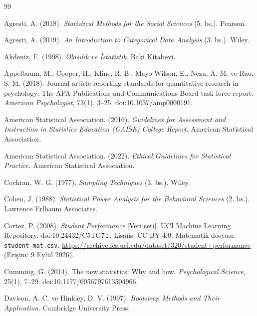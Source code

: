 \cleardoublepage
{}
{}

\begin{thebibliography}{99}

Agresti, A. (2018).
\textit{Statistical Methods for the Social Sciences} (5. bs.). Pearson.

Agresti, A. (2019).
\textit{An Introduction to Categorical Data Analysis} (3. bs.). Wiley.

Akdeniz, F. (1998).
\textit{Olasılık ve İstatistik}. Baki Kitabevi.

Appelbaum, M., Cooper, H., Kline, R. B., Mayo-Wilson, E., Nezu, A. M. ve
Rao, S. M. (2018). Journal article reporting standards for quantitative
research in psychology: The APA Publications and Communications Board task
force report. \textit{American Psychologist}, 73(1), 3--25.
doi:10.1037/amp0000191.

American Statistical Association. (2016).
\textit{Guidelines for Assessment and Instruction in Statistics Education
(GAISE) College Report}. American Statistical Association.

American Statistical Association. (2022).
\textit{Ethical Guidelines for Statistical Practice}. American Statistical
Association.

Cochran, W. G. (1977).
\textit{Sampling Techniques} (3. bs.). Wiley.

Cohen, J. (1988).
\textit{Statistical Power Analysis for the Behavioral Sciences} (2. bs.).
Lawrence Erlbaum Associates.

Cortez, P. (2008). \textit{Student Performance} [Veri seti].
UCI Machine Learning Repository. doi:10.24432/C5TG7T.
Lisans: CC BY 4.0. Matematik dosyası: \texttt{student-mat.csv}.
\url{https://archive.ics.uci.edu/dataset/320/student+performance}
(Erişim: 9 Eylül 2026).

Cumming, G. (2014). The new statistics: Why and how.
\textit{Psychological Science}, 25(1), 7--29.
doi:10.1177/0956797613504966.

\ifimoders\else
{}
Davison, A. C. ve Hinkley, D. V. (1997).
\textit{Bootstrap Methods and Their Application}. Cambridge University Press.
\fi


\end{thebibliography}
